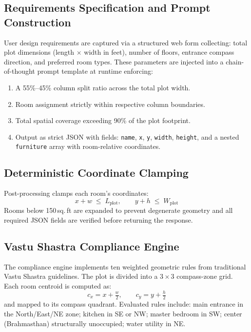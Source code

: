 \documentclass[10pt, twocolumn, letterpaper]{article}
\begin{document}
  \subsection{Requirements Specification and Prompt Construction}

  User design requirements are captured via a structured web form collecting:
  total plot dimensions (length $\times$ width in feet), number of floors,
  entrance compass direction, and preferred room types. These parameters are
  injected into a chain-of-thought prompt template at runtime enforcing:
  \begin{enumerate}[leftmargin=*, label=\arabic*., itemsep=0pt, topsep=2pt]
    \item A 55\%--45\% column split ratio across the total plot width.
    \item Room assignment strictly within respective column boundaries.
    \item Total spatial coverage exceeding 90\% of the plot footprint.
    \item Output as strict JSON with fields: \texttt{name}, \texttt{x},
          \texttt{y}, \texttt{width}, \texttt{height}, and a nested
          \texttt{furniture} array with room-relative coordinates.
  \end{enumerate}

  \subsection{Deterministic Coordinate Clamping}

  Post-processing clamps each room's coordinates:
  \begin{equation}
    x + w \;\leq\; L_{\text{plot}}, \qquad y + h \;\leq\; W_{\text{plot}}
  \end{equation}
  Rooms below 150\,sq.\,ft are expanded to prevent degenerate geometry and all
  required JSON fields are verified before returning the response.

  \subsection{Vastu Shastra Compliance Engine}

  The compliance engine implements ten weighted geometric rules from traditional
  Vastu Shastra guidelines. The plot is divided into a $3{\times}3$ compass-zone
  grid. Each room centroid is computed as:
  \begin{equation}
    c_x = x + \tfrac{w}{2}, \qquad c_y = y + \tfrac{h}{2}
  \end{equation}
  and mapped to its compass quadrant. Evaluated rules include: main entrance in
  the North/East/NE zone; kitchen in SE or NW; master bedroom in SW; center
  (Brahmasthan) structurally unoccupied; water utility in NE.
\end{document}
